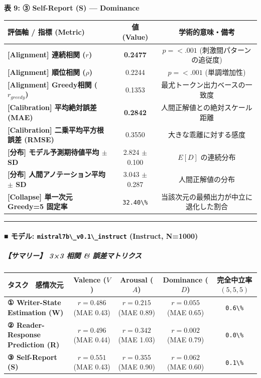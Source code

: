 \textbf{表 9: ③ Self-Report (S) — Dominance}
\begin{center}
\small
\begin{tabular}{lcc}
\toprule
\textbf{評価軸 / 指標 (Metric)} & \textbf{値 (Value)} & \textbf{学術的意味・備考} \\
\midrule
\textbf{[Alignment] 連続相関 ($r$)} & \textbf{0.2477} & $p = <.001 $ (刺激間パターンの追従度) \\
\textbf{[Alignment] 順位相関 ($\rho$)} & 0.2244 & $p = <.001 $ (単調増加性) \\
\textbf{[Alignment] Greedy相関 ($r_{greedy}$)} & 0.1353 & 最尤トークン出力ベースの一致度 \\
\textbf{[Calibration] 平均絶対誤差 (MAE)} & \textbf{0.2842} & 人間正解値との絶対スケール距離 \\
\textbf{[Calibration] 二乗平均平方根誤差 (RMSE)} & 0.3550 & 大きな乖離に対する感度 \\
\textbf{[分布] モデル予測期待値平均 $\pm$ SD} & 2.824 $\pm$ 0.100 & $E[D]$ の連続分布 \\
\textbf{[分布] 人間アノテーション平均 $\pm$ SD} & 3.043 $\pm$ 0.287 & 人間正解値の分布 \\
\textbf{[Collapse] 単一次元 Greedy=5 固定率} & \texttt{32.40\textbackslash{}\%} & 当該次元の最頻出力が中立に退化した割合 \\
\bottomrule
\end{tabular}
\end{center}


\vspace{0.5em}\hrule\vspace{0.5em}

\paragraph{■ モデル: \texttt{mistral7b\textbackslash{}\_v0.1\textbackslash{}\_instruct} (Instruct, N=1000)}

\subparagraph{【サマリー】 3×3 相関 \& 誤差マトリクス}
\begin{center}
\small
\begin{tabular}{lcccc}
\toprule
\textbf{タスク \ 感情次元} & \textbf{Valence ($V$)} & \textbf{Arousal ($A$)} & \textbf{Dominance ($D$)} & \textbf{完全中立率 $(5,5,5)$} \\
\midrule
\textbf{① Writer-State Estimation (W)} & \textbf{$r=0.486$} (MAE 0.43) & \textbf{$r=0.215$} (MAE 0.89) & \textbf{$r=0.055$} (MAE 0.65) & \texttt{0.6\textbackslash{}\%} \\
\textbf{② Reader-Response Prediction (R)} & \textbf{$r=0.496$} (MAE 0.44) & \textbf{$r=0.342$} (MAE 1.03) & \textbf{$r=0.002$} (MAE 0.79) & \texttt{0.0\textbackslash{}\%} \\
\textbf{③ Self-Report (S)} & \textbf{$r=0.551$} (MAE 0.43) & \textbf{$r=0.355$} (MAE 0.90) & \textbf{$r=0.062$} (MAE 0.60) & \texttt{0.1\textbackslash{}\%} \\
\bottomrule
\end{tabular}
\end{center}


